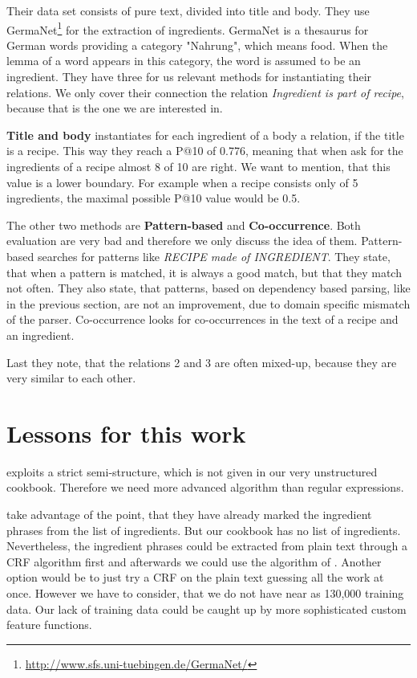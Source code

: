\documentclass[12pt, twoside]{report}
\begin{document}
Their data set consists of pure text, divided into title and body. They use GermaNet\footnote{\url{http://www.sfs.uni-tuebingen.de/GermaNet/}} for the extraction of ingredients. GermaNet is a thesaurus for German words providing a category "Nahrung", which means food. When the lemma of a word appears in this category, the word is assumed to be an ingredient. They have three for us relevant methods for instantiating their relations. We only cover their  connection the relation \textit{Ingredient is part of recipe}, because that is the one we are interested in.

\textbf{Title and body} instantiates for each ingredient of a body a relation, if the title is a recipe. This way they reach a P@10 of 0.776, meaning that when ask for the ingredients of a recipe almost 8 of 10 are right. We want to mention, that this value is a lower boundary. For example when a recipe consists only of 5 ingredients, the maximal possible P@10 value would be 0.5.

The other two methods are \textbf{Pattern-based} and \textbf{Co-occurrence}. Both evaluation are very bad and therefore we only discuss the idea of them. Pattern-based searches for patterns like \textit{RECIPE made of INGREDIENT}. They state, that when a pattern is matched, it is always a good match, but that they match not often. They also state, that patterns, based on dependency based parsing, like in the previous section, are not an improvement, due to domain specific mismatch of the parser. Co-occurrence looks for co-occurrences in the text of a recipe and an ingredient.

Last they note, that the relations 2 and 3 are often mixed-up, because they are very similar to each other.
 


\section{Lessons for this work}
\parencite{REgutGenug} exploits a strict semi-structure, which is not given in our very unstructured cookbook. Therefore we need more advanced algorithm than regular expressions.

\parencite{CRFZeit} take advantage of the point, that they have already marked the ingredient phrases from the list of ingredients. But our cookbook has no list of ingredients. Nevertheless, the ingredient phrases could be extracted from plain text through a CRF algorithm first and afterwards we could use the algorithm of \parencite{CRFZeit}. Another option would be to just try a CRF on the plain text guessing all the work at once. However we have to consider, that we do not have near as 130,000 training data. Our lack of training data could be caught up by more sophisticated custom feature functions.
\end{document}
